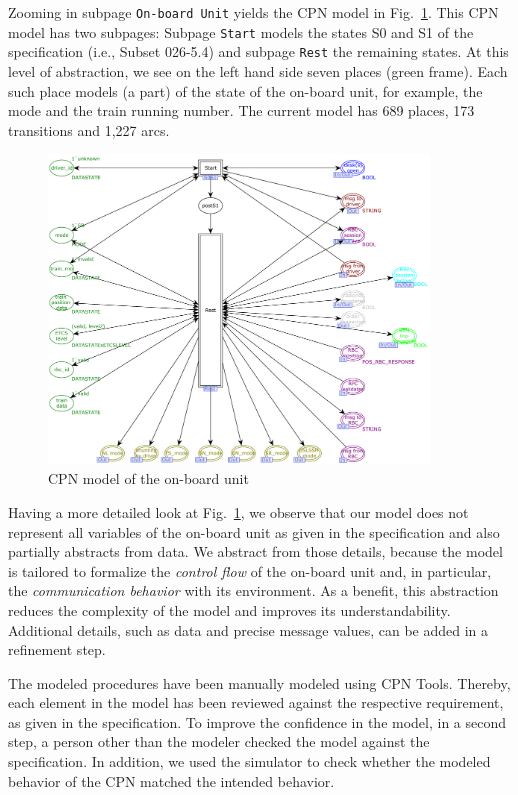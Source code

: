 Zooming in subpage \texttt{On-board Unit} yields the CPN model in Fig.~\ref{fig:OBUnit}. This CPN model has two subpages: Subpage \texttt{Start} models the states S0 and S1 of the specification (i.e., Subset 026-5.4) and subpage \texttt{Rest} the remaining states. At this level of abstraction, we see on the left hand side seven places (green frame). Each such place models (a part) of the state of the on-board unit, for example, the mode and the train running number. The current model has 689 places, 173 transitions and 1,227 arcs.

\begin{figure}[tb]
	\centering
		\includegraphics[width=0.9\textwidth]{figures/OBUnit.pdf}
	\caption{CPN model of the on-board unit}
	\label{fig:OBUnit}
\end{figure}

Having a more detailed look at Fig.~\ref{fig:OBUnit}, we observe that our model does not represent all variables of the on-board unit as given in the specification and also partially abstracts from data. We abstract from those details, because the model is tailored to formalize the \textit{control flow} of the on-board unit and, in particular, the \textit{communication behavior} with its environment. As a benefit, this abstraction reduces the complexity of the model and improves its understandability. Additional details, such as data and precise message values, can be added in a refinement step.

The modeled procedures have been manually modeled using CPN Tools. Thereby, each element in the model has been reviewed against the respective requirement, as given in the specification. To improve the confidence in the model, in a second step, a person other than the modeler checked the model against the specification. In addition, we used the simulator to check whether the modeled behavior of the CPN matched the intended behavior.

